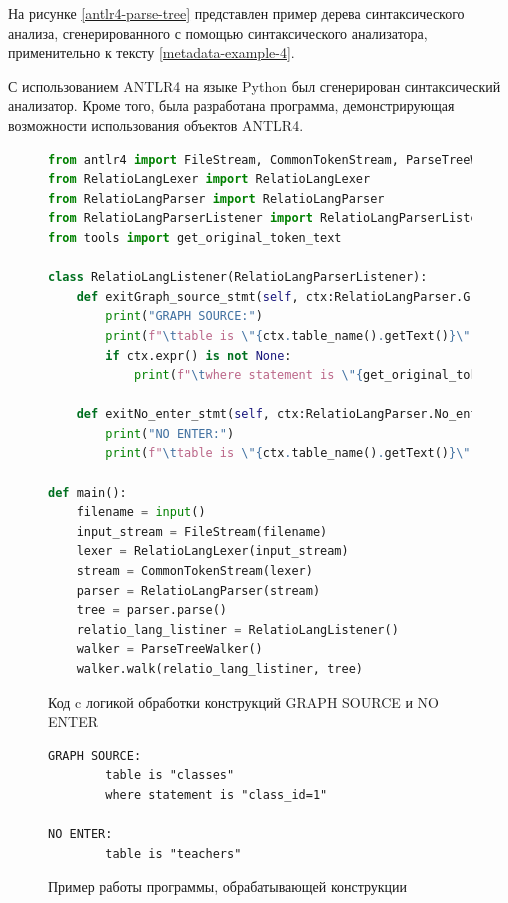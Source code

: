 На рисунке \ref{antlr4-parse-tree} представлен пример дерева синтаксического анализа, сгенерированного с помощью синтаксического анализатора, применительно к тексту \ref{metadata-example-4}.

С использованием ANTLR4 на языке Python был сгенерирован синтаксический анализатор. Кроме того, была разработана программа, демонстрирующая возможности использования объектов ANTLR4.

\begin{figure}
  \begin{lstlisting}[language=Python]
from antlr4 import FileStream, CommonTokenStream, ParseTreeWalker
from RelatioLangLexer import RelatioLangLexer
from RelatioLangParser import RelatioLangParser
from RelatioLangParserListener import RelatioLangParserListener
from tools import get_original_token_text

class RelatioLangListener(RelatioLangParserListener):
    def exitGraph_source_stmt(self, ctx:RelatioLangParser.Graph_source_stmtContext):
        print("GRAPH SOURCE:")
        print(f"\ttable is \"{ctx.table_name().getText()}\"")
        if ctx.expr() is not None:
            print(f"\twhere statement is \"{get_original_token_text(ctx.expr())}\"")

    def exitNo_enter_stmt(self, ctx:RelatioLangParser.No_enter_stmtContext):
        print("NO ENTER:")
        print(f"\ttable is \"{ctx.table_name().getText()}\"")

def main():
    filename = input()
    input_stream = FileStream(filename)
    lexer = RelatioLangLexer(input_stream)
    stream = CommonTokenStream(lexer)
    parser = RelatioLangParser(stream)
    tree = parser.parse()
    relatio_lang_listiner = RelatioLangListener()
    walker = ParseTreeWalker()
    walker.walk(relatio_lang_listiner, tree)
  \end{lstlisting}
  \caption{Код c логикой обработки конструкций GRAPH SOURCE и NO ENTER}
  \label{antlr4-program}
\end{figure}

\begin{figure}
  \begin{lstlisting}
GRAPH SOURCE:
        table is "classes"
        where statement is "class_id=1"

NO ENTER:
        table is "teachers"
  \end{lstlisting}
  \caption{Пример работы программы, обрабатывающей конструкции}
  \label{antlr4-program-out}
\end{figure}

